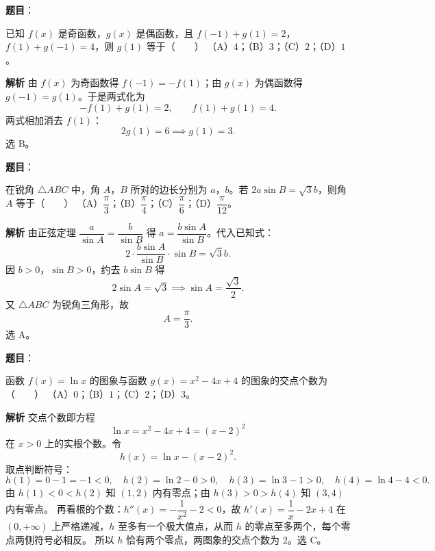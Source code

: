 \begin{answer}

\textbf{题目}：

已知 $f(x)$ 是奇函数，$g(x)$ 是偶函数，且 $f(-1)+g(1)=2$，$f(1)+g(-1)=4$，则 $g(1)$ 等于\mbox{（　　）}
（A）$4$；（B）$3$；（C）$2$；（D）$1$。

\textbf{解析}
由 $f(x)$ 为奇函数得 $f(-1)=-f(1)$；由 $g(x)$ 为偶函数得 $g(-1)=g(1)$。于是两式化为
\nopagebreak[4]
\[-f(1)+g(1)=2,\qquad f(1)+g(1)=4.\]
两式相加消去 $f(1)$：
\nopagebreak[4]
\[2g(1)=6\implies g(1)=3.\]
选 B。


\end{answer}
\begin{answer}

\textbf{题目}：

在锐角 $\triangle ABC$ 中，角 $A$，$B$ 所对的边长分别为 $a$，$b$。若 $2a\sin B=\sqrt3b$，则角 $A$ 等于\mbox{（　　）}
（A）$\dfrac\pi3$；（B）$\dfrac\pi4$；（C）$\dfrac\pi6$；（D）$\dfrac\pi{12}$。

\textbf{解析}
由正弦定理 $\dfrac a{\sin A}=\dfrac b{\sin B}$ 得 $a=\dfrac{b\sin A}{\sin B}$。代入已知式：
\nopagebreak[4]
\[2\cdot\frac{b\sin A}{\sin B}\cdot\sin B=\sqrt3b.\]
因 $b>0$，$\sin B>0$，约去 $b\sin B$ 得
\nopagebreak[4]
\[2\sin A=\sqrt3\implies\sin A=\frac{\sqrt3}2.\]
又 $\triangle ABC$ 为锐角三角形，故
\nopagebreak[4]
\[A=\frac\pi3.\]
选 A。


\end{answer}
\begin{answer}

\textbf{题目}：

函数 $f(x)=\ln x$ 的图象与函数 $g(x)=x^2-4x+4$ 的图象的交点个数为\mbox{（　　）}
（A）$0$；（B）$1$；（C）$2$；（D）$3$。

\textbf{解析}
交点个数即方程
\nopagebreak[4]
\[\ln x=x^2-4x+4=(x-2)^2\]
在 $x>0$ 上的实根个数。令
\nopagebreak[4]
\[h(x)=\ln x-(x-2)^2.\]
取点判断符号：
\nopagebreak[4]
\[h(1)=0-1=-1<0,\quad h(2)=\ln2-0>0,\quad h(3)=\ln3-1>0,\quad h(4)=\ln4-4<0.\]
由 $h(1)<0<h(2)$ 知 $(1,2)$ 内有零点；由 $h(3)>0>h(4)$ 知 $(3,4)$ 内有零点。
再看根的个数：$h''(x)=-\dfrac1{x^2}-2<0$，故 $h'(x)=\dfrac1x-2x+4$ 在 $(0,+\infty)$ 上严格递减，$h$ 至多有一个极大值点，从而 $h$ 的零点至多两个，每个零点两侧符号必相反。
所以 $h$ 恰有两个零点，两图象的交点个数为 $2$。选 C。


\end{answer}
